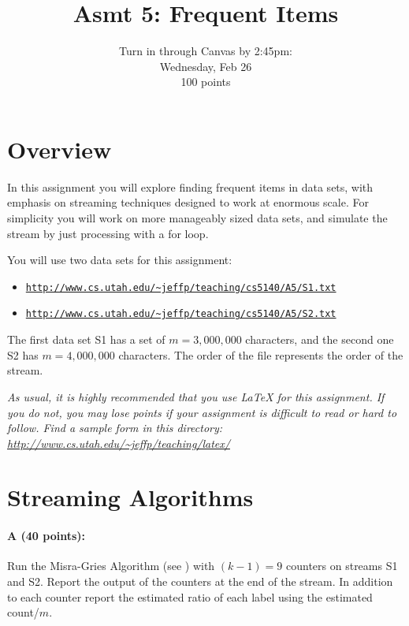 \documentclass[11pt]{article}
\title{Asmt 5: Frequent Items}
\author{Turn in through Canvas by 2:45pm: \\
Wednesday, Feb 26 \\
100 points}
\date{}
\begin{document}
\maketitle





\section*{Overview}

In this assignment you will explore finding frequent items in data sets, with emphasis on streaming techniques designed to work at enormous scale.  For simplicity you will work on more manageably sized data sets, and simulate the stream by just processing with a for loop.  

You will use two data sets for this assignment:
\begin{itemize} \denselist
\item \href{http://www.cs.utah.edu/~jeffp/teaching/cs5140/A5/S1.txt}{\texttt{http://www.cs.utah.edu/\~{}jeffp/teaching/cs5140/A5/S1.txt}}
\item \href{http://www.cs.utah.edu/~jeffp/teaching/cs5140/A5/S2.txt}{\texttt{http://www.cs.utah.edu/\~{}jeffp/teaching/cs5140/A5/S2.txt}}
\end{itemize}
The first data set S1 has a set of $m = 3{,}000{,}000$ characters, and the second one S2 has $m = 4{,}000{,}000$ characters.  The order of the file represents the order of the stream.  

\vspace{.1in}

\emph{As usual, it is highly recommended that you use LaTeX for this assignment.  If you do not, you may lose points if your assignment is difficult to read or hard to follow.  Find a sample form in this directory:
\url{http://www.cs.utah.edu/~jeffp/teaching/latex/}}


\section{Streaming Algorithms}

\paragraph{A (40 points):}  
Run the Misra-Gries Algorithm (see \textbf{}) with $(k-1)=9$ counters on streams S1 and S2.  Report the output of the counters at the end of the stream.  In addition to each counter report the estimated ratio of each label using the estimated count/$m$.  
\end{document}
